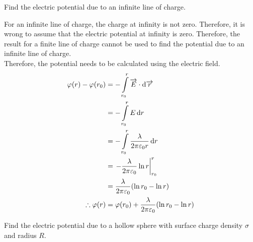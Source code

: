 \documentclass[fleqn, a4paper, 12pt, twoside]{article}
\theoremstyle{definition}
\theoremstyle{theorem}
\begin{document}
\begin{question}
	Find the electric potential due to an infinite line of charge.
\end{question}

\begin{solution}
	For an infinite line of charge, the charge at infinity is not zero.
	Therefore, it is wrong to assume that the electric potential at infinity is zero.
	Therefore, the result for a finite line of charge cannot be used to find the potential due to an infinite line of charge.\\
	Therefore, the potential needs to be calculated using the electric field.
	\begin{align*}
		\varphi(r) - \varphi(r_0) &= -\int\limits_{r_0}^{r} \overrightarrow{E} \cdot \dif \overrightarrow{r}\\
		&= - \int\limits_{r_0}^{r} E \dif r\\
		&= - \int\limits_{r_0}^{r} \dfrac{\lambda}{2 \pi \varepsilon_0 r} \dif r\\
		&= \left. - \dfrac{\lambda}{2 \pi \varepsilon_0} \ln r \right|_{r_0}^{r}\\
		&= \dfrac{\lambda}{2 \pi \varepsilon_0} (\ln r_0 - \ln r)\\
		\therefore \varphi(r) &= \varphi(r_0) + \dfrac{\lambda}{2 \pi \varepsilon_0} (\ln r_0 - \ln r)
	\end{align*}
\end{solution}

\begin{question}
	Find the electric potential due to a hollow sphere with surface charge density $\sigma$ and radius $R$.
\end{question}
\end{document}
